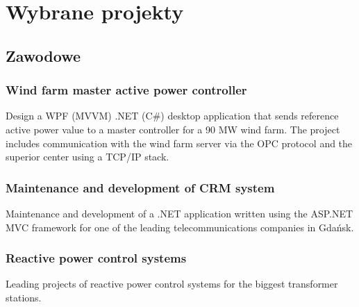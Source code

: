 \documentclass[letterpaper]{template/twentysecondcv} %
\begin{document}
\begin{twenty} %
\end{twenty}

\vspace{-0.25cm}
\section{Wybrane projekty}
\subsection{Zawodowe}
\vspace{-0.25cm}


\subsubsection*{Wind farm master active power controller}
Design a WPF (MVVM) .NET (C\#) desktop application that sends reference active power value to a master controller for a 90 MW wind farm. The project includes communication with the wind farm server via the OPC protocol and the superior center using a TCP/IP stack.

\subsubsection*{Maintenance and development of CRM system}
Maintenance and development of a .NET application written using the ASP.NET MVC framework for one of the leading telecommunications companies in Gdańsk. 

\subsubsection*{Reactive power control systems}
Leading projects of reactive power control systems for the biggest transformer stations.
\end{document}
